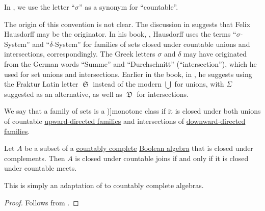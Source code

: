 \begin{remark}\label{rem:sigma_prefix_etymology}
  In , we use the letter \enquote{\( \sigma \)} as a synonym for \enquote{countable}.

  The origin of this convention is not clear. The discussion in \cite{MathOF:what_does_the_sigma_in_sigma_algebra_stand_for} suggests that Felix Hausdorff may be the originator. In his book, \cite[\S V.18]{Hausdorff1935Mengenlehre}, Hausdorff uses the terms \enquote{\( \sigma \)-System} and \enquote{\( \delta \)-System} for families of sets closed under countable unions and intersections, correspondingly. The Greek letters \( \sigma \) and \( \delta \) may have originated from the German words \enquote{Summe} and \enquote{Durchschnitt} (\enquote{intersection}), which he used for set unions and intersections. Earlier in the book, in \cite[\S I.3]{Hausdorff1962Sets}, he suggests using the Fraktur Latin letter \( \mfrakS \) instead of the modern \( \bigcup \) for unions, with \( \Sigma \) suggested as an alternative, as well as \( \mfrakD \) for intersections.
\end{remark}

\begin{definition}\label{def:monotone_class}
  We say that a family of sets is a \term[ru=монотонный класс, en=monotone class (\cite[27]{Halmos1976MeasureTheory})]{monotone class} if it is closed under both unions of countable \hyperref[def:directed_set]{upward-directed families} and intersections of \hyperref[def:directed_set]{downward-directed families}.
\end{definition}

\begin{lemma}\label{thm:boolean_subalgebra_countable_de_morgan}
  Let \( A \) be a subset of a \hyperref[def:countably_complete_lattice]{countably complete} \hyperref[def:boolean_algebra]{Boolean algebra} that is closed under complements. Then \( A \) is closed under countable joins if and only if it is closed under countable meets.
\end{lemma}
\begin{comments}
  \item This is simply an adaptation of  to countably complete algebras.
\end{comments}
\begin{proof}
  Follows from .
\end{proof}


